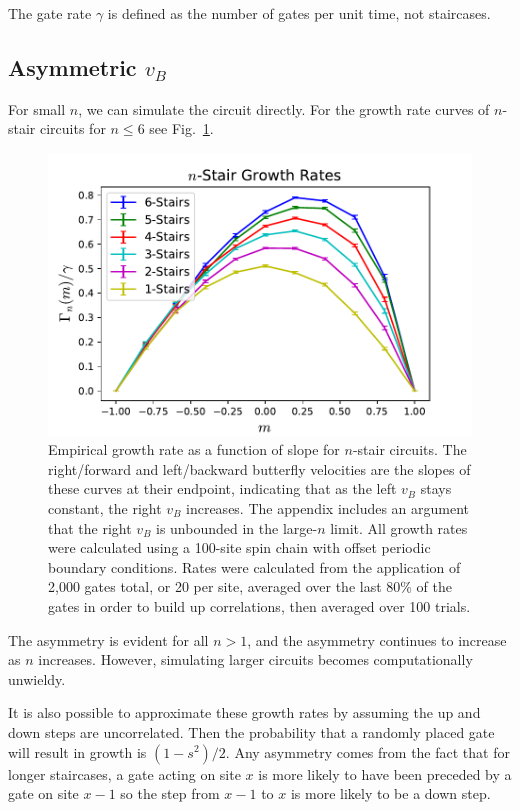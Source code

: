 \documentclass[aps,prx,reprint,superscriptaddress, longbibliography]{revtex4-1}
\begin{document}
The gate rate $\gamma$ is defined as the number of gates per unit time, not staircases.



\subsection{Asymmetric $v_B$}

For small $n$, we can simulate the circuit directly. For the growth rate curves of $n$-stair circuits for $n\le 6$ see Fig.~\ref{fig:compareRates}. 
\begin{figure}
	\includegraphics[width=\columnwidth]{compareRates.pdf}
	\caption{Empirical growth rate as a function of slope for $n$-stair circuits. The right/forward and left/backward butterfly velocities are the slopes of these curves at their endpoint, indicating that as the left $v_B$ stays constant, the right $v_B$ increases. The appendix includes an argument that the right $v_B$ is unbounded in the large-$n$ limit. All growth rates were calculated using a 100-site spin chain with offset periodic boundary conditions. Rates were calculated from the application of 2,000 gates total, or 20 per site, averaged over the last 80\% of the gates in order to build up correlations, then averaged over 100 trials.}
	\label{fig:compareRates}
\end{figure}
The asymmetry is evident for all $n>1$, and the asymmetry continues to increase as $n$ increases. However, simulating larger circuits becomes computationally unwieldy.
	
It is also possible to approximate these growth rates by assuming the up and down steps are uncorrelated. Then the probability that a randomly placed gate will result in growth is $(1-s^2)/2$. Any asymmetry comes from the fact that for longer staircases, a gate acting on site $x$ is more likely to have been preceded by a gate on site $x-1$ so the step from $x-1$ to $x$ is more likely to be a down step.
\end{document}
